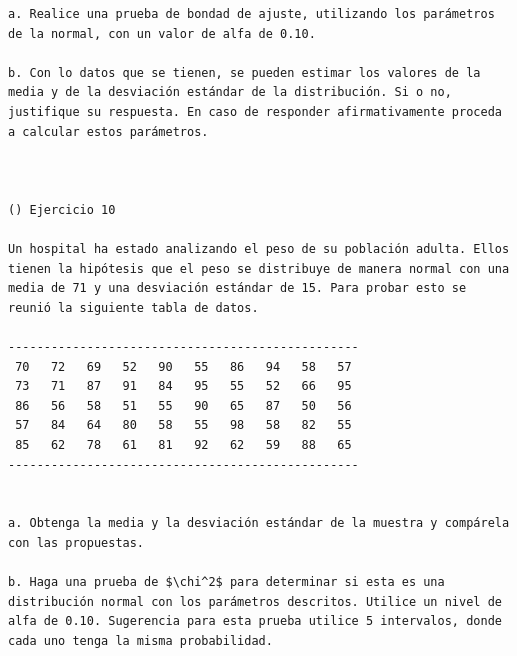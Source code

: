 \begin{verbatim}
a. Realice una prueba de bondad de ajuste, utilizando los parámetros de la normal, con un valor de alfa de 0.10.

b. Con lo datos que se tienen, se pueden estimar los valores de la media y de la desviación estándar de la distribución. Si o no, justifique su respuesta. En caso de responder afirmativamente proceda a calcular estos parámetros.



() Ejercicio 10

Un hospital ha estado analizando el peso de su población adulta. Ellos tienen la hipótesis que el peso se distribuye de manera normal con una media de 71 y una desviación estándar de 15. Para probar esto se reunió la siguiente tabla de datos.

-------------------------------------------------
 70   72   69   52   90   55   86   94   58   57
 73   71   87   91   84   95   55   52   66   95
 86   56   58   51   55   90   65   87   50   56
 57   84   64   80   58   55   98   58   82   55
 85   62   78   61   81   92   62   59   88   65
-------------------------------------------------


a. Obtenga la media y la desviación estándar de la muestra y compárela con las propuestas.

b. Haga una prueba de $\chi^2$ para determinar si esta es una distribución normal con los parámetros descritos. Utilice un nivel de alfa de 0.10. Sugerencia para esta prueba utilice 5 intervalos, donde cada uno tenga la misma probabilidad.


\end{verbatim}
